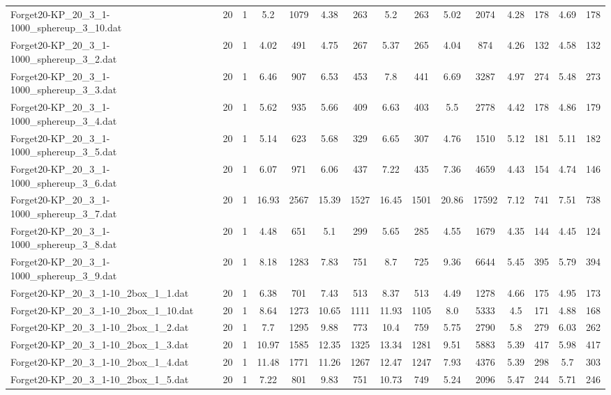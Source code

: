 \begin{table}[!ht]
{\begin{tabular}{lcccccccccccccc}
Forget20-KP\_20\_3\_1-1000\_sphereup\_3\_10.dat & 20 & 1 & 5.2 & 1079 & 4.38 & 263 & 5.2 & 263 & 5.02 & 2074 & 4.28 & 178 & 4.69 & 178 \\
Forget20-KP\_20\_3\_1-1000\_sphereup\_3\_2.dat & 20 & 1 & 4.02 & 491 & 4.75 & 267 & 5.37 & 265 & 4.04 & 874 & 4.26 & 132 & 4.58 & 132 \\
Forget20-KP\_20\_3\_1-1000\_sphereup\_3\_3.dat & 20 & 1 & 6.46 & 907 & 6.53 & 453 & 7.8 & 441 & 6.69 & 3287 & 4.97 & 274 & 5.48 & 273 \\
Forget20-KP\_20\_3\_1-1000\_sphereup\_3\_4.dat & 20 & 1 & 5.62 & 935 & 5.66 & 409 & 6.63 & 403 & 5.5 & 2778 & 4.42 & 178 & 4.86 & 179 \\
Forget20-KP\_20\_3\_1-1000\_sphereup\_3\_5.dat & 20 & 1 & 5.14 & 623 & 5.68 & 329 & 6.65 & 307 & 4.76 & 1510 & 5.12 & 181 & 5.11 & 182 \\
Forget20-KP\_20\_3\_1-1000\_sphereup\_3\_6.dat & 20 & 1 & 6.07 & 971 & 6.06 & 437 & 7.22 & 435 & 7.36 & 4659 & 4.43 & 154 & 4.74 & 146 \\
Forget20-KP\_20\_3\_1-1000\_sphereup\_3\_7.dat & 20 & 1 & 16.93 & 2567 & 15.39 & 1527 & 16.45 & 1501 & 20.86 & 17592 & 7.12 & 741 & 7.51 & 738 \\
Forget20-KP\_20\_3\_1-1000\_sphereup\_3\_8.dat & 20 & 1 & 4.48 & 651 & 5.1 & 299 & 5.65 & 285 & 4.55 & 1679 & 4.35 & 144 & 4.45 & 124 \\
Forget20-KP\_20\_3\_1-1000\_sphereup\_3\_9.dat & 20 & 1 & 8.18 & 1283 & 7.83 & 751 & 8.7 & 725 & 9.36 & 6644 & 5.45 & 395 & 5.79 & 394 \\
Forget20-KP\_20\_3\_1-10\_2box\_1\_1.dat & 20 & 1 & 6.38 & 701 & 7.43 & 513 & 8.37 & 513 & 4.49 & 1278 & 4.66 & 175 & 4.95 & 173 \\
Forget20-KP\_20\_3\_1-10\_2box\_1\_10.dat & 20 & 1 & 8.64 & 1273 & 10.65 & 1111 & 11.93 & 1105 & 8.0 & 5333 & 4.5 & 171 & 4.88 & 168 \\
Forget20-KP\_20\_3\_1-10\_2box\_1\_2.dat & 20 & 1 & 7.7 & 1295 & 9.88 & 773 & 10.4 & 759 & 5.75 & 2790 & 5.8 & 279 & 6.03 & 262 \\
Forget20-KP\_20\_3\_1-10\_2box\_1\_3.dat & 20 & 1 & 10.97 & 1585 & 12.35 & 1325 & 13.34 & 1281 & 9.51 & 5883 & 5.39 & 417 & 5.98 & 417 \\
Forget20-KP\_20\_3\_1-10\_2box\_1\_4.dat & 20 & 1 & 11.48 & 1771 & 11.26 & 1267 & 12.47 & 1247 & 7.93 & 4376 & 5.39 & 298 & 5.7 & 303 \\
Forget20-KP\_20\_3\_1-10\_2box\_1\_5.dat & 20 & 1 & 7.22 & 801 & 9.83 & 751 & 10.73 & 749 & 5.24 & 2096 & 5.47 & 244 & 5.71 & 246 \\

\end{tabular}}
\end{table}
